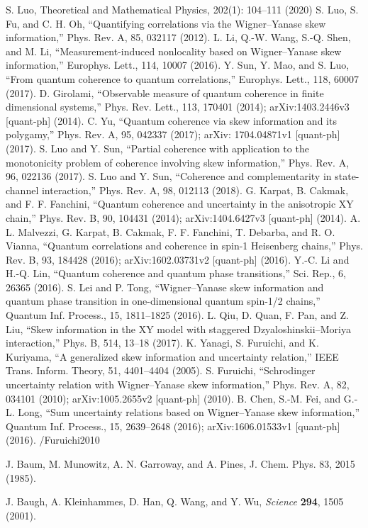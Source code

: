 \begin{thebibliography}{}
 S. Luo, Theoretical and Mathematical Physics, 202(1): 104–111 (2020)
 S. Luo, S. Fu, and C. H. Oh, “Quantifying correlations via the Wigner–Yanase skew information,” Phys. Rev. A,
85, 032117 (2012).
 L. Li, Q.-W. Wang, S.-Q. Shen, and M. Li, “Measurement-induced nonlocality based on Wigner–Yanase skew
information,” Europhys. Lett., 114, 10007 (2016).
 Y. Sun, Y. Mao, and S. Luo, “From quantum coherence to quantum correlations,” Europhys. Lett., 118, 60007
(2017).
 D. Girolami, “Observable measure of quantum coherence in finite dimensional systems,” Phys. Rev. Lett., 113,
170401 (2014); arXiv:1403.2446v3 [quant-ph] (2014).
 C. Yu, “Quantum coherence via skew information and its polygamy,” Phys. Rev. A, 95, 042337 (2017); arXiv:
1704.04871v1 [quant-ph] (2017).
 S. Luo and Y. Sun, “Partial coherence with application to the monotonicity problem of coherence involving skew
information,” Phys. Rev. A, 96, 022136 (2017).
 S. Luo and Y. Sun, “Coherence and complementarity in state-channel interaction,” Phys. Rev. A, 98, 012113
(2018).
 G. Karpat, B. Cakmak, and F. F. Fanchini, “Quantum coherence and uncertainty in the anisotropic XY chain,”
Phys. Rev. B, 90, 104431 (2014); arXiv:1404.6427v3 [quant-ph] (2014).
 A. L. Malvezzi, G. Karpat, B. Cakmak, F. F. Fanchini, T. Debarba, and R. O. Vianna, “Quantum correlations
and coherence in spin-1 Heisenberg chains,” Phys. Rev. B, 93, 184428 (2016); arXiv:1602.03731v2 [quant-ph]
(2016).
 Y.-C. Li and H.-Q. Lin, “Quantum coherence and quantum phase transitions,” Sci. Rep., 6, 26365 (2016).
 S. Lei and P. Tong, “Wigner–Yanase skew information and quantum phase transition in one-dimensional quantum spin-1/2 chains,” Quantum Inf. Process., 15, 1811–1825 (2016).
 L. Qiu, D. Quan, F. Pan, and Z. Liu, “Skew information in the XY model with staggered Dzyaloshinskii–Moriya
interaction,” Phys. B, 514, 13–18 (2017).
 K. Yanagi, S. Furuichi, and K. Kuriyama, “A generalized skew information and uncertainty relation,” IEEE Trans. Inform. Theory, 51, 4401–4404 (2005).
 S. Furuichi, “Schrodinger uncertainty relation with Wigner–Yanase skew information,” Phys. Rev. A, 82, 034101 (2010); arXiv:1005.2655v2 [quant-ph] (2010).
 B. Chen, S.-M. Fei, and G.-L. Long, “Sum uncertainty relations based on Wigner–Yanase skew information,” Quantum Inf. Process., 15, 2639–2648 (2016); arXiv:1606.01533v1 [quant-ph] (2016).
/Furuichi2010


 J. Baum, M. Munowitz, A. N. Garroway, and A. Pines, J. Chem. Phys. 83, 2015 (1985).


J. Baugh, A. Kleinhammes, D. Han, Q. Wang, and Y. Wu, \textit{Science} \textbf{294}, 1505 (2001).

\end{thebibliography}
